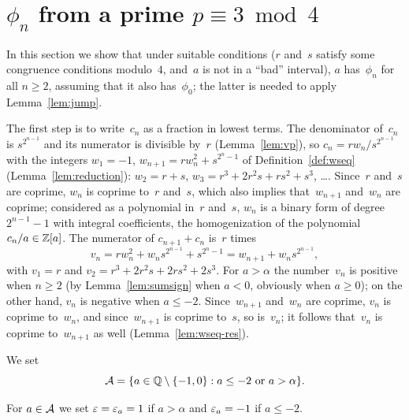 \section{\texorpdfstring{$\phi_n$}{phi\_n} from a prime \texorpdfstring{$p \equiv 3 \bmod 4$}{p = 3
mod 4}} \paperitems

In this section we show that under suitable conditions ($r$ and~$s$ satisfy some congruence
conditions modulo~$4$, and~$a$ is not in a ``bad'' interval), $a$ has~$\phi_n$ for all
$n \ge 2$, assuming that it also has~$\phi_0$; the latter is needed to apply
Lemma~\ref{lem:jump}.

The first step is to write~$c_n$ as a fraction in lowest terms. The denominator of~$c_n$ is
$s^{2^{n-1}}$ and its numerator is divisible by~$r$ (Lemma~\ref{lem:vp}), so
$c_n = r w_n / s^{2^{n-1}}$ with the integers $w_1 = -1$, $w_{n+1} = r w_n^2 + s^{2^n - 1}$ of
Definition~\ref{def:wseq} (Lemma~\ref{lem:reduction}): $w_2 = r + s$,
$w_3 = r^3 + 2r^2 s + r s^2 + s^3$, \dots. Since~$r$ and~$s$ are coprime, $w_n$ is coprime
to~$r$ and~$s$, which also implies that~$w_{n+1}$ and~$w_n$ are coprime; considered as a polynomial in~$r$
and~$s$, $w_n$ is a binary form of degree $2^{n-1} - 1$ with integral coefficients, the homogenization of the
polynomial $c_n/a \in \mathbb{Z}[a]$. The numerator of $c_{n+1} + c_n$ is~$r$ times
\[ v_n = r w_n^2 + w_n s^{2^{n-1}} + s^{2^n - 1} = w_{n+1} + w_n s^{2^{n-1}}, \]
with $v_1 = r$ and $v_2 = r^3 + 2r^2 s + 2rs^2 + 2s^3$. For $a > \alpha$ the number~$v_n$ is
positive when $n \ge 2$ (by Lemma~\ref{lem:sumsign} when $a < 0$, obviously when $a \ge 0$); on
the other hand, $v_n$ is negative when $a \le -2$. Since~$w_{n+1}$
and~$w_n$ are coprime, $v_n$ is coprime to~$w_n$, and since~$w_{n+1}$ is coprime to~$s$, so
is~$v_n$; it follows that~$v_n$ is coprime to~$w_{n+1}$ as well (Lemma~\ref{lem:wseq-res}).

\begin{definition}
  \label{def:calA}
  \leanok
  We set
  \[ \mathcal{A} = \{a \in \mathbb{Q} \setminus \{-1, 0\} : \text{$a \le -2$ or $a > \alpha$}\}. \]
\end{definition}

\begin{definition}
  \label{def:eps}
  \leanok
  For $a \in \mathcal{A}$ we set $\varepsilon = \varepsilon_a = 1$ if $a > \alpha$ and $\varepsilon_a = -1$ if $a \le -2$.
\end{definition}

